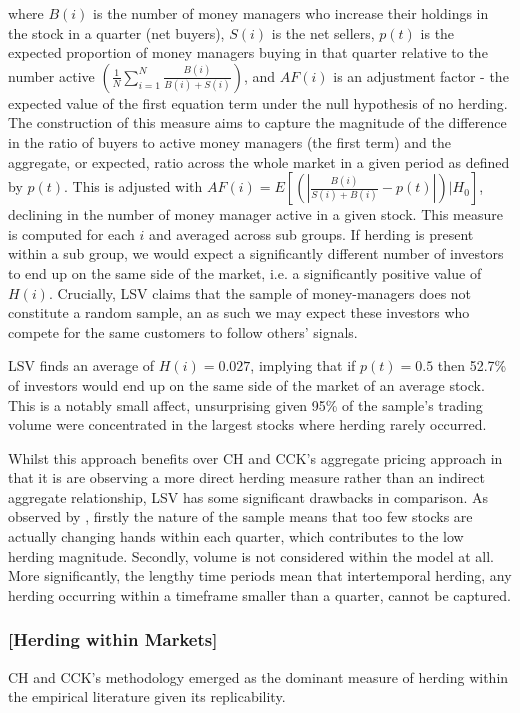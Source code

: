 \documentclass[12pt]{article}
\numberwithin{table}{section}   %
\begin{document}
where $B(i)$ is the number of money managers who increase their holdings in the stock in a quarter (net buyers), $S(i)$ is the net sellers, $p(t)$ is the expected proportion of money managers buying in that quarter relative to the number active $(\frac{1}{N}\sum^N_{i=1}\frac{B(i)}{B(i)+S(i)})$, and $AF(i)$ is an adjustment factor - the expected value of the first equation term under the null hypothesis of no herding. The construction of this measure aims to capture the magnitude of the difference in the ratio of buyers to active money managers (the first term) and the aggregate, or expected, ratio across the whole market in a given period as defined by $p(t)$. This is adjusted with $AF(i)=E[(|\frac{B(i)}{S(i)+B(i)}-p(t)|)|H_0]$, declining in the number of money manager active in a given stock. This measure is computed for each $i$ and averaged across sub groups. If herding is present within a sub group, we would expect a significantly different number of investors to end up on the same side of the market, i.e. a significantly positive value of $H(i)$. Crucially, LSV claims that the sample of money-managers does not constitute a random sample, an as such we may expect these investors who compete for the same customers to follow others’ signals.

LSV finds an average of $H(i)=0.027$, implying that if $p(t)=0.5$  then 52.7\% of investors would end up on the same side of the market of an average stock. This is a notably small affect, unsurprising given 95\% of the sample’s trading volume were concentrated in the largest stocks where herding rarely occurred. 

Whilst this approach benefits over CH and CCK’s aggregate pricing approach in that it is are observing a more direct herding measure rather than an indirect aggregate relationship, LSV has some significant drawbacks in comparison. As observed by \citet{bikh-review}, firstly the nature of the sample means that too few stocks are actually changing hands within each quarter, which contributes to the low herding magnitude. Secondly, volume is not considered within the model at all. More significantly, the lengthy time periods mean that intertemporal herding, any herding occurring within a timeframe smaller than a quarter, cannot be captured.

\subsubsection*{[Herding within Markets]} 

CH and CCK’s methodology emerged as the dominant measure of herding within the empirical literature given its replicability.
\end{document}
